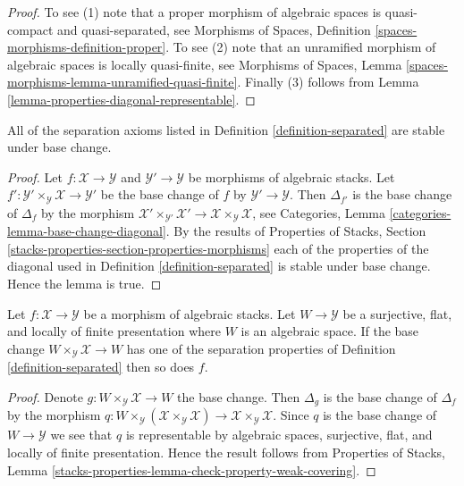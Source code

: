 \begin{proof}
To see (1) note that a proper morphism of algebraic spaces is quasi-compact
and quasi-separated, see
Morphisms of Spaces, Definition \ref{spaces-morphisms-definition-proper}.
To see (2) note that an unramified morphism of algebraic spaces is locally
quasi-finite, see
Morphisms of Spaces, Lemma
\ref{spaces-morphisms-lemma-unramified-quasi-finite}.
Finally (3) follows from Lemma \ref{lemma-properties-diagonal-representable}.
\end{proof}

\begin{lemma}
\label{lemma-base-change-separated}
All of the separation axioms listed in
Definition \ref{definition-separated}
are stable under base change.
\end{lemma}

\begin{proof}
Let $f : \mathcal{X} \to \mathcal{Y}$ and
$\mathcal{Y}' \to \mathcal{Y}$ be morphisms of algebraic stacks.
Let $f' : \mathcal{Y}' \times_\mathcal{Y} \mathcal{X} \to \mathcal{Y}'$
be the base change of $f$ by $\mathcal{Y}' \to \mathcal{Y}$.
Then $\Delta_{f'}$ is the base change of $\Delta_f$ by the morphism
$\mathcal{X}' \times_{\mathcal{Y}'} \mathcal{X}' \to
\mathcal{X} \times_\mathcal{Y} \mathcal{X}$, see
Categories, Lemma \ref{categories-lemma-base-change-diagonal}.
By the results of
Properties of Stacks,
Section \ref{stacks-properties-section-properties-morphisms}
each of the properties of the diagonal used in
Definition \ref{definition-separated}
is stable under base change. Hence the lemma is true.
\end{proof}

\begin{lemma}
\label{lemma-check-separated-covering}
Let $f : \mathcal{X} \to \mathcal{Y}$ be a morphism of algebraic stacks.
Let $W \to \mathcal{Y}$ be a surjective, flat, and locally of finite
presentation where $W$ is an algebraic space. If the base change
$W \times_\mathcal{Y} \mathcal{X} \to W$ has one of the separation properties
of Definition \ref{definition-separated}
then so does $f$.
\end{lemma}

\begin{proof}
Denote $g : W \times_\mathcal{Y} \mathcal{X} \to W$ the base change.
Then $\Delta_g$ is the base change of $\Delta_f$ by the morphism
$q : W \times_\mathcal{Y} (\mathcal{X} \times_\mathcal{Y} \mathcal{X})
\to \mathcal{X} \times_\mathcal{Y} \mathcal{X}$. Since $q$ is the base
change of $W \to \mathcal{Y}$ we see that $q$ is representable by algebraic
spaces, surjective, flat, and locally of finite presentation. Hence the
result follows from
Properties of Stacks, Lemma
\ref{stacks-properties-lemma-check-property-weak-covering}.
\end{proof}

